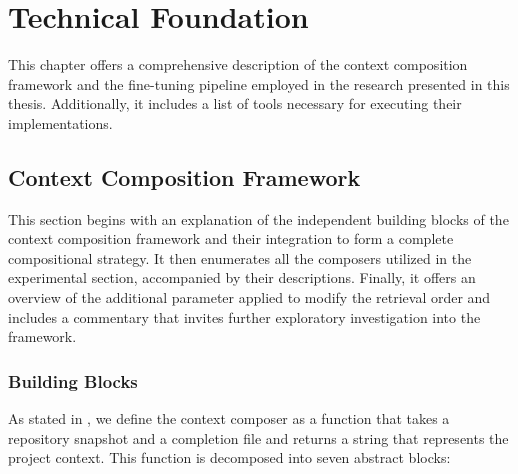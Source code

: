 \chapter{Technical Foundation}\label{chap:technical-foundation}  %

This chapter offers a comprehensive description of the context composition framework and the fine-tuning pipeline employed in the research presented in this thesis. Additionally, it includes a list of tools necessary for executing their implementations.

\section{Context Composition Framework}

This section begins with an explanation of the independent building blocks of the context composition framework and their integration to form a complete compositional strategy. It then enumerates all the composers utilized in the experimental section, accompanied by their descriptions. Finally, it offers an overview of the additional parameter applied to modify the retrieval order and includes a commentary that invites further exploratory investigation into the framework.

\subsection{Building Blocks}

As stated in , we define the context composer as a function that takes a repository snapshot and a completion file and returns a string that represents the project context. This function is decomposed into seven abstract blocks:

